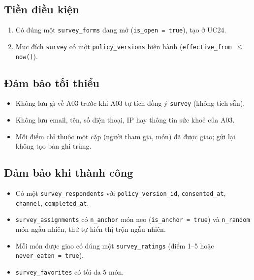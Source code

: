 \subsection{Tiền điều kiện}
\begin{enumerate}
\item Có đúng một {\small\texttt{survey\_\allowbreak{}\allowbreak{}forms}} đang mở ({\small\texttt{is\_\allowbreak{}\allowbreak{}open = true}}), tạo ở UC24.
\item Mục đích {\small\texttt{survey}} có một {\small\texttt{policy\_\allowbreak{}\allowbreak{}versions}} hiện hành ({\small\texttt{effective\_\allowbreak{}\allowbreak{}from \ensuremath{\leq} now()}}).
\end{enumerate}
\subsection{Đảm bảo tối thiểu}
\begin{itemize}
\item Không lưu gì về A03 trước khi A03 tự tích đồng ý {\small\texttt{survey}} (không tích sẵn).
\item Không lưu email, tên, số điện thoại, IP hay thông tin sức khoẻ của A03.
\item Mỗi điểm chỉ thuộc một cặp (người tham gia, món) đã được giao; gửi lại không tạo bản ghi trùng.
\end{itemize}
\subsection{Đảm bảo khi thành công}
\begin{itemize}
\item Có một {\small\texttt{survey\_\allowbreak{}\allowbreak{}respondents}} với {\small\texttt{policy\_\allowbreak{}\allowbreak{}version\_\allowbreak{}\allowbreak{}id}}, {\small\texttt{consented\_\allowbreak{}\allowbreak{}at}}, {\small\texttt{channel}}, {\small\texttt{completed\_\allowbreak{}\allowbreak{}at}}.
\item {\small\texttt{survey\_\allowbreak{}\allowbreak{}assignments}} có {\small\texttt{n\_\allowbreak{}\allowbreak{}anchor}} món neo ({\small\texttt{is\_\allowbreak{}\allowbreak{}anchor = true}}) và {\small\texttt{n\_\allowbreak{}\allowbreak{}random}} món ngẫu nhiên, thứ tự hiển thị trộn ngẫu nhiên.
\item Mỗi món được giao có đúng một {\small\texttt{survey\_\allowbreak{}\allowbreak{}ratings}} (điểm 1--5 hoặc {\small\texttt{never\_\allowbreak{}\allowbreak{}eaten = true}}).
\item {\small\texttt{survey\_\allowbreak{}\allowbreak{}favorites}} có tối đa 5 món.
\end{itemize}
